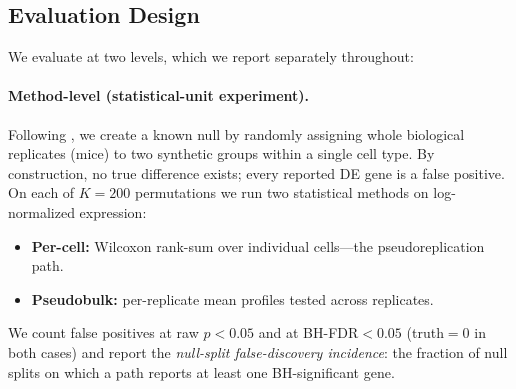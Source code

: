 \documentclass[pmlr,twocolumn,10pt]{jmlr}
\begin{document}
\subsection{Evaluation Design}

We evaluate at two levels, which we report separately throughout:

\paragraph{Method-level (statistical-unit experiment).}
Following \citet{squair2021}, we create a known null by randomly assigning whole
biological replicates (mice) to two synthetic groups within a single cell type.
By construction, no true difference exists; every reported DE gene is a false
positive. On each of $K{=}200$ permutations we run two statistical methods on
log-normalized expression:
\begin{itemize}
    \item \textbf{Per-cell:} Wilcoxon rank-sum over individual
    cells---the pseudoreplication path.
    \item \textbf{Pseudobulk:} per-replicate mean profiles tested
    across replicates.
\end{itemize}
We count false positives at raw $p<0.05$ and at BH-FDR${<}0.05$ (truth${=}0$
in both cases) and report the \textit{null-split false-discovery incidence}: the
fraction of null splits on which a path reports at least one BH-significant gene.
\end{document}
